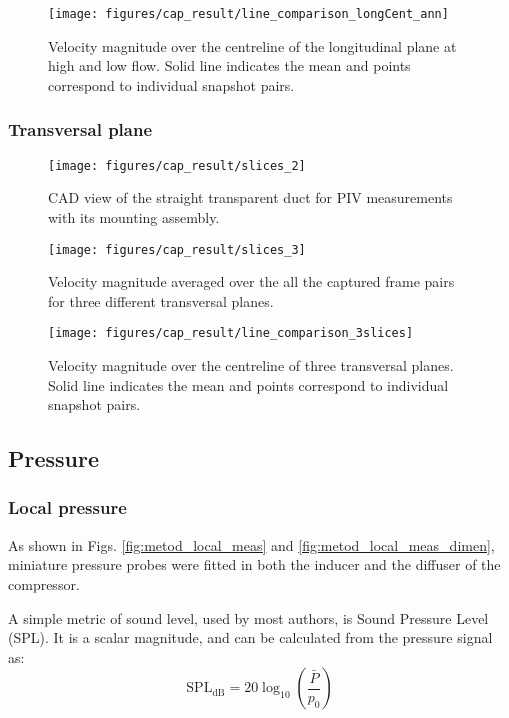\begin{figure}[htb!]
\centering
\texttt{[image: figures/cap\_result/line\_comparison\_longCent\_ann]}
\caption{Velocity magnitude over the centreline of the longitudinal plane at high and low flow. Solid line indicates the mean and points correspond to individual snapshot pairs.}
\label{fig:line_comp_long}
\end{figure}

\subsubsection{Transversal plane}

\begin{figure*}[htb!]
\centering
\texttt{[image: figures/cap\_result/slices\_2]}
\caption{CAD view of the straight transparent duct for PIV measurements with its mounting assembly.}
\label{fig:res_trans_20mm}
\end{figure*}

\begin{figure*}[b!]
\centering
\texttt{[image: figures/cap\_result/slices\_3]}
\caption{Velocity magnitude averaged over the all the captured frame pairs for three different transversal planes.}
\label{fig:res_trans_20mm}
\end{figure*}

\begin{figure}[b!]
\centering
\texttt{[image: figures/cap\_result/line\_comparison\_3slices]}
\caption{Velocity magnitude over the centreline of three transversal planes. Solid line indicates the mean and points correspond to individual snapshot pairs.}
\label{fig:line_comp_3slices}
\end{figure}

\subsection{Pressure}
\label{sub:pressure}

\subsubsection{Local pressure}

As shown in Figs. \ref{fig:metod_local_meas} and \ref{fig:metod_local_meas_dimen}, miniature pressure probes were fitted in both the inducer and the diffuser of the compressor.

A simple metric of sound level, used by most authors, is Sound Pressure Level (SPL). It is a scalar magnitude, and can be calculated from the pressure signal as:
\begin{equation}
  \text{SPL}_\text{dB} = 20\log_{10}\left(\frac{\bar P}{p_0}\right)
\end{equation}

